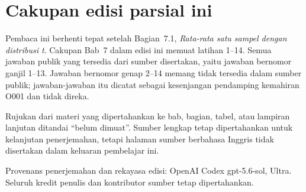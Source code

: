 \documentclass[10pt,openany]%
{book}
\date{}
\begin{document}
%
\renewcommand{\thepage}{}
\maketitle

\renewcommand{\thepage}{\arabic{page}}
\tableofcontents

\normalsize

\chapter*{Cakupan edisi parsial ini}
Pembaca ini berhenti tepat setelah Bagian~7.1,
\emph{Rata-rata satu sampel dengan distribusi t}. Cakupan Bab~7 dalam
edisi ini memuat latihan 1--14. Semua jawaban publik yang tersedia dari
sumber disertakan, yaitu jawaban bernomor ganjil 1--13. Jawaban bernomor
genap 2--14 memang tidak tersedia dalam sumber publik; jawaban-jawaban itu
dicatat sebagai kesenjangan pendamping kemahiran O001 dan tidak direka.

Rujukan dari materi yang dipertahankan ke bab, bagian, tabel, atau lampiran
lanjutan ditandai ``belum dimuat''. Sumber lengkap tetap dipertahankan untuk
kelanjutan penerjemahan, tetapi halaman sumber berbahasa Inggris tidak
disertakan dalam keluaran pembelajar ini.

Provenans penerjemahan dan rekayasa edisi: OpenAI Codex gpt-5.6-sol, Ultra.
Seluruh kredit penulis dan kontributor sumber tetap dipertahankan.

\begingroup
\makeatletter
\def\@currentlabel{belum dimuat}
\label{ch_regr_mult_and_log}

\label{ch_regr_simple_linear}
\label{appendix_data}
\label{linRegrForTwoVar}
\label{normalProbabilityTable}
\label{chiSquareProbabilityTable}
\label{tDistributionTable}
\label{multipleAndLogisticRegression}
\makeatother
\endgroup
\end{document}
